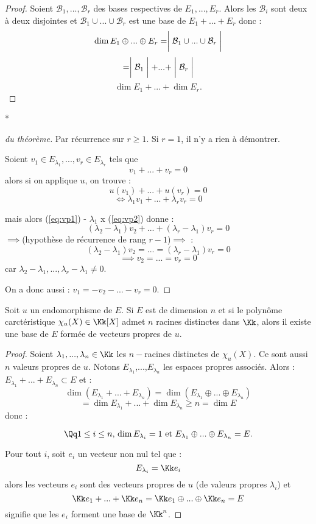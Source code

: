 \documentclass[class=report,crop=false]{standalone}
\begin{document}
\begin{proof}
Soient $\mathcal{B}_1,...,\mathcal{B}_r$ des bases respectives de $E_1,...,E_r$. Alors les $\mathcal{B}_i$ sont deux à deux disjointes et $\mathcal{B}_1 \cup ... \cup \mathcal{B}_r$ est une base de $E_1+...+E_r$ donc :
\[\dim E_1 \oplus ... \oplus E_r = \biggm | \mathcal{B}_1 \cup ... \cup \mathcal{B}_r\biggm |  \]
\[= \biggm |\mathcal{B}_1 \biggm | + ... + \biggm |\mathcal{B}_r \biggm | \]
\[\dim E_1 +...+\dim E_r .\]
\end{proof}
\begin{center}
*
\end{center}
\begin{proof}[du théorème]
Par récurrence sur $r \ge 1$. Si $r=1$, il n'y a rien à démontrer.

Soient $v_1 \in E_{\lambda_1},...,v_r \in E_{\lambda_r}$ tels que 
\begin{equation}\label{eq:vp1}
v_1+...+v_r=0
\end{equation}
alors si on applique $u$, on trouve :
\begin{equation}
u(v_1)+...+u(v_r)=0
\end{equation}
\begin{equation}\label{eq:vp2}
\iff \lambda_1 v_1 +...+\lambda_r v_r =0
\end{equation}

mais alors (\ref{eq:vp1}) - $\lambda_1$ x (\ref{eq:vp2}) donne :
\[(\lambda_2-\lambda_1)v_2+...+(\lambda_r-\lambda_1)v_r = 0 \]
$\implies$(hypothèse de récurrence de rang $r-1$)$\implies$ :
\[(\lambda_2-\lambda_1)v_2 = ... = (\lambda_r-\lambda_1)v_r = 0\]
\[\implies v_2=...=v_r=0\]
car $\lambda_2-\lambda_1,...,\lambda_r-\lambda_1\neq 0$.

On a donc aussi : $v_1 = -v_2-...-v_r =0$.
\end{proof}

\begin{corollaire}
Soit $ u$ un endomorphisme de $E$. Si $E$ est de dimension $n$ et si le polynôme carctéristique $\chi_u(X)\in\Kk[X]$ admet $n$ racines distinctes dans $\Kk$, alors il existe une base de $E$ formée de vecteurs propres de $u$.
\end{corollaire}

\begin{proof}
Soient $\lambda_1,...,\lambda_n \in \Kk$ les $n-$racines distinctes de $\chi_u(X)$. Ce sont aussi $n$ valeurs propres de $u$. Notons $E_{\lambda_1}$,...,$E_{\lambda_n}$ les espaces propres associés. Alors : $E_{\lambda_1}+...+E_{\lambda_n} \subset E$ et :
\[\dim (E_{\lambda_1}+...+E_{\lambda_n}) = \dim (E_{\lambda_1}\oplus ... \oplus E_{\lambda_n})\]
\[= \dim E_{\lambda_1} +...+ \dim E_{\lambda_n} \ge n=\dim E\]
donc :

\[\Qq 1\le i \le n,\, \dim E_{\lambda_i} =1 \text{ et } E_{\lambda_1}\oplus ... \oplus E_{\lambda_n} = E.\]

Pour tout $i$, soit $e_i$ un vecteur non nul tel que :
\[E_{\lambda_i} = \Kk e_i\]
alors les vecteurs $e_i$ sont des vecteurs propres de $u$ (de valeurs propres $\lambda_i$) et \[\Kk e_1+...+\Kk e_n = \Kk e_1\oplus...\oplus\Kk e_n = E\]
signifie que les $e_i$ forment une base de $\Kk^n$.
\end{proof}
\end{document}
